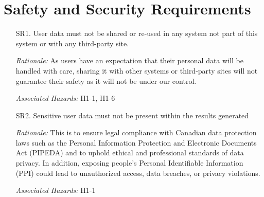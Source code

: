 \documentclass{article}
\begin{document}
\section{Safety and Security Requirements}
\begin{enumerate}
   \item[SR1.] User data must not be shared or re-used in any system not part of this system or with any third-party site.
   \item[] \emph{Rationale:}  As users have an expectation that their personal data will be handled with care, sharing it with other systems or third-party sites will not guarantee their safety as it will not be under our control.
   \item[] \emph{Associated Hazards:} H1-1, H1-6\\
   \item[SR2.] Sensitive user data must not be present within the results generated
   \item[] \emph{Rationale:}  This is to ensure legal compliance with Canadian data protection laws such as the Personal Information Protection and Electronic Documents Act (PIPEDA) and to uphold ethical and professional standards of data privacy. In addition, exposing people's Personal Identifiable Information (PPI) could lead to unauthorized access, data breaches, or privacy violations.
   \item[] \emph{Associated Hazards:} H1-1\\
 

\end{enumerate}
\end{document}
